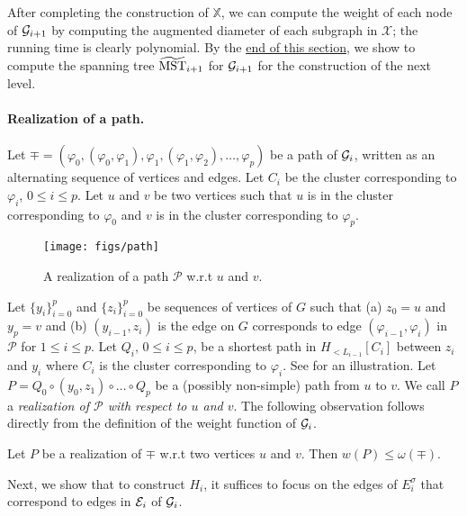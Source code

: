 After completing the construction of $\mathbb{X}$, we can compute the weight of each node of $\mathcal{G}_{i+1}$ by computing the augmented diameter of each subgraph in $\mathcal{X}$; the running time is clearly polynomial. By the \hyperlink{MSTiPlus1}{end of this section}, we show to compute the spanning tree  $\widetilde{\mathrm{MST}}_{i+1}$ for $\mathcal{G}_{i+1}$ for the construction of the next level.

\paragraph{Realization of a path.~}  Let $\mp = ( \varphi_0, (\varphi_0,\varphi_1), \varphi_1, (\varphi_1,\varphi_2), \ldots, \varphi_{p})$ be a path of $\mathcal{G}_i$, written as an alternating sequence of vertices and edges. Let $C_i$ be the cluster corresponding to $\varphi_i$, $0\leq i \leq p$. Let $u$ and $v$ be two vertices such that $u$ is in the cluster corresponding to $\varphi_0$ and $v$ is in the cluster corresponding to $\varphi_p$. 
\begin{figure}[!h]
	\begin{center}
		\texttt{[image: figs/path]}
	\end{center}
	\caption{A realization of a path $\mathcal{P}$ w.r.t $u$ and $v$.}
	\label{fig:path}
\end{figure}
Let $\{y_i\}_{i=0}^p$ and $\{z_i\}_{i=0}^p$ be sequences of vertices of $G$ such that (a) $z_0 = u$ and $y_p = v$ and (b) $(y_{i-1}, z_i)$ is the edge on $G$ corresponds to edge $(\varphi_{i-1},\varphi_i)$ in $\mathcal{P}$ for $1\leq i\leq p$. Let $Q_i$, $0\leq i \leq p$, be a shortest path in $H_{< L_{i-1}}[C_i]$ between $z_i$ and $y_i$ where $C_i$ is the cluster corresponding to $\varphi_i$. See  for an illustration. Let $P = Q_0\circ (y_0,z_1)\circ \ldots\circ Q_p$ be a (possibly non-simple) path from $u$ to $v$. We call $P$ a \emph{realization of $\mathcal{P}$ with respect to $u$ and $v$}. The following observation follows directly from the definition of the weight function of $\mathcal{G}_i$.

\begin{observation}\label{obs:realization} Let $P$ be a realization of $\mp$ w.r.t two vertices $u$ and $v$. Then $w(P) \leq \omega(\mp)$.
\end{observation}



Next, we show that to construct $H_i$, it suffices to focus on the edges of $E^{\sigma}_i$ that correspond to edges in $\mathcal{E}_i$ of $\mathcal{G}_i$. 

